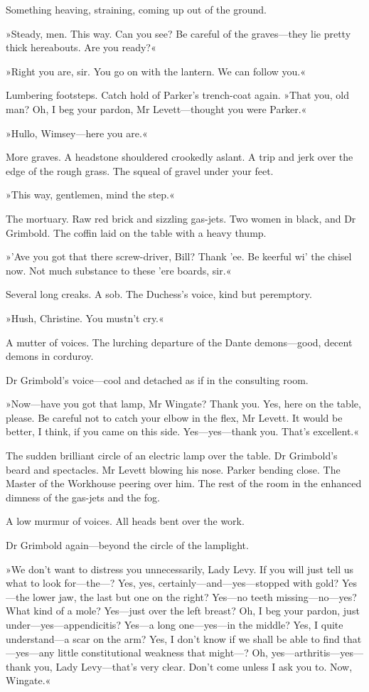 Something heaving, straining, coming up out of the ground.

»Steady, men. This way. Can you see? Be careful of the graves—they lie pretty thick hereabouts. Are you ready?«

»Right you are, sir. You go on with the lantern. We can follow you.«

Lumbering footsteps. Catch hold of Parker's trench-coat again. »That you, old man? Oh, I beg your pardon, Mr Levett—thought you were Parker.«

»Hullo, Wimsey—here you are.«

More graves. A headstone shouldered crookedly aslant. A trip and jerk over the edge of the rough grass. The squeal of gravel under your feet.

»This way, gentlemen, mind the step.«

The mortuary. Raw red brick and sizzling gas-jets. Two women in black, and Dr Grimbold. The coffin laid on the table with a heavy thump.

»'Ave you got that there screw-driver, Bill? Thank 'ee. Be keerful wi' the chisel now. Not much substance to these 'ere boards, sir.«

Several long creaks. A sob. The Duchess's voice, kind but peremptory.

»Hush, Christine. You mustn't cry.«

A mutter of voices. The lurching departure of the Dante demons—good, decent demons in corduroy.

Dr Grimbold's voice—cool and detached as if in the consulting room.

»Now—have you got that lamp, Mr Wingate? Thank you. Yes, here on the table, please. Be careful not to catch your elbow in the flex, Mr Levett. It would be better, I think, if you came on this side. Yes—yes---thank you. That's excellent.«

The sudden brilliant circle of an electric lamp over the table. Dr Grimbold's beard and spectacles. Mr Levett blowing his nose. Parker bending close. The Master of the Workhouse peering over him. The rest of the room in the enhanced dimness of the gas-jets and the fog.

A low murmur of voices. All heads bent over the work.

Dr Grimbold again—beyond the circle of the lamplight.

»We don't want to distress you unnecessarily, Lady Levy. If you will just tell us what to look for—the---? Yes, yes, certainly—and---yes—stopped with gold? Yes—the lower jaw, the last but one on the right? Yes—no teeth missing—no---yes? What kind of a mole? Yes—just over the left breast? Oh, I beg your pardon, just under—yes---ap\-pen\-dici\-tis? Yes—a long one—yes---in the middle? Yes, I quite understand—a scar on the arm? Yes, I don't know if we shall be able to find that—yes---any little constitutional weakness that might---? Oh, yes—arthritis---yes—thank you, Lady Levy—that's very clear. Don't come unless I ask you to. Now, Wingate.«

